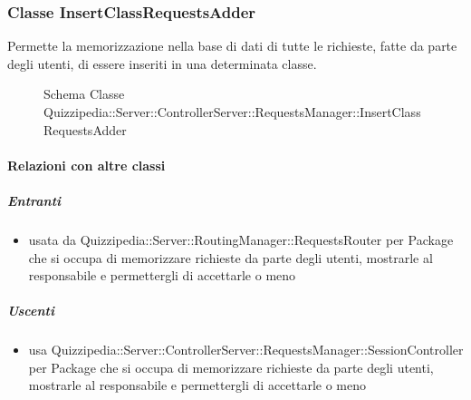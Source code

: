 \subsubsection{Classe InsertClassRequestsAdder}
Permette la memorizzazione nella base di dati di tutte le richieste, fatte da parte degli utenti, di essere inseriti in una determinata classe.
\begin{figure}[H]
\centering
\noindent{}
\caption[Schema Classe InsertClassRequestsAdder]{Schema Classe Quizzipedia::Server::ControllerServer::RequestsManager::InsertClassRequestsAdder}
\end{figure}
\paragraph{Relazioni con altre classi}
\subparagraph{Entranti}
\begin{itemize}
\item usata da Quizzipedia::Server::RoutingManager::RequestsRouter per Package che si occupa di memorizzare richieste da parte degli utenti, mostrarle al responsabile e permettergli di accettarle o meno
\end{itemize}
\subparagraph{Uscenti}
\begin{itemize}
\item usa Quizzipedia::Server::ControllerServer::RequestsManager::SessionController per Package che si occupa di memorizzare richieste da parte degli utenti, mostrarle al responsabile e permettergli di accettarle o meno
\end{itemize}
